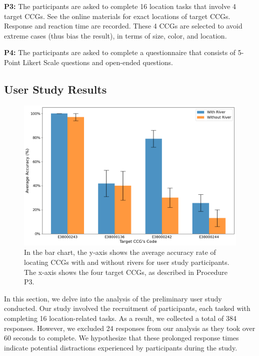 \documentclass[Afour,sagev,times]{sagej}
\begin{document}
\textbf{P3:} The participants are asked to complete 16 location tasks that involve 4 target CCGs.
See the online materials for exact locations of target CCGs.
Response and reaction time are recorded.
These 4 CCGs are selected to avoid extreme cases (thus bias the result), in terms of size, color, and location.

\textbf{P4:} The participants are asked to complete a questionnaire that consists of 5-Point Likert Scale questions and open-ended questions.


\subsection{User Study Results}
\label{subsec:{User Study Results}}

{
\begin{figure}[b!]
    \centering
    \includegraphics[width=\columnwidth,keepaspectratio]{accuracy.png}
    \caption{In the bar chart, the y-axis shows the average accuracy rate of locating CCGs with and without rivers for user study participants.
        The x-axis shows the four target CCGs, as described in Procedure P3.}
    \label{fig:task-acc}
\end{figure}
}


In this section, we delve into the analysis of the preliminary user study conducted.
Our study involved the recruitment of \pCount participants, each tasked with completing 16 location-related tasks.
As a result, we collected a total of 384 responses.
However, we excluded 24 responses from our analysis as they took over 60 seconds to complete.
We hypothesize that these prolonged response times indicate potential distractions experienced by participants during the study.
\end{document}

